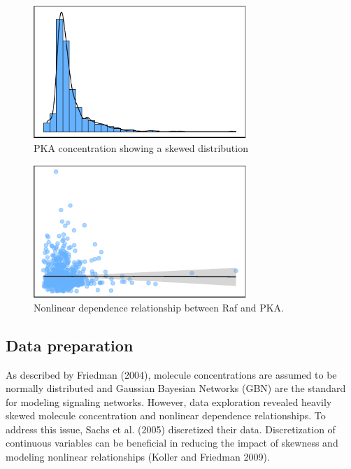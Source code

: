 \documentclass[twocol]{ametsoc}
\begin{document}
\begin{figure}[h]
 \centerline{\includegraphics[width=19pc]{images/skewed_dist.pdf}}
  \caption{PKA concentration showing a skewed distribution}\label{f2}
\end{figure}

\begin{figure}[h]
 \centerline{\includegraphics[width=19pc]{images/nonlinear_rel.pdf}}
  \caption{Nonlinear dependence relationship between Raf and PKA.}\label{f3}
\end{figure}

\hypertarget{data-preparation}{%
\subsection{Data preparation}\label{data-preparation}}

As described by Friedman (2004), molecule concentrations are assumed to
be normally distributed and Gaussian Bayesian Networks (GBN) are the
standard for modeling signaling networks. However, data exploration
revealed heavily skewed molecule concentration and nonlinear dependence
relationships. To address this issue, Sachs et al. (2005) discretized
their data. Discretization of continuous variables can be beneficial in
reducing the impact of skewness and modeling nonlinear relationships
(Koller and Friedman 2009).
\end{document}
